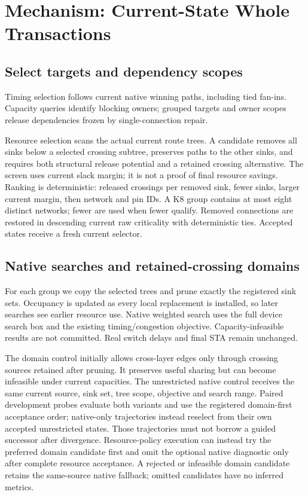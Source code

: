 \documentclass[conference,10pt]{IEEEtran}
\begin{document}
\section{Mechanism: Current-State Whole Transactions}
\subsection{Select targets and dependency scopes}
Timing selection follows current native winning paths, including tied fan-ins. Capacity queries identify blocking owners; grouped targets and owner scopes release dependencies frozen by single-connection repair.

Resource selection scans the actual current route trees. A candidate removes all sinks below a selected crossing subtree, preserves paths to the other sinks, and requires both structural release potential and a retained crossing alternative. The screen uses current slack margin; it is not a proof of final resource savings. Ranking is deterministic: released crossings per removed sink, fewer sinks, larger current margin, then network and pin IDs. A K8 group contains at most eight distinct networks; fewer are used when fewer qualify. Removed connections are restored in descending current raw criticality with deterministic ties. Accepted states receive a fresh current selector.

\subsection{Native searches and retained-crossing domains}
For each group we copy the selected trees and prune exactly the registered sink sets. Occupancy is updated as every local replacement is installed, so later searches see earlier resource use. Native weighted search uses the full device search box and the existing timing/congestion objective. Capacity-infeasible results are not committed. Real switch delays and final STA remain unchanged.

The domain control initially allows cross-layer edges only through crossing sources retained after pruning. It preserves useful sharing but can become infeasible under current capacities. The unrestricted native control receives the same current source, sink set, tree scope, objective and search range. Paired development probes evaluate both variants and use the registered domain-first acceptance order; native-only trajectories instead reselect from their own accepted unrestricted states. Those trajectories must not borrow a guided successor after divergence. Resource-policy execution can instead try the preferred domain candidate first and omit the optional native diagnostic only after complete resource acceptance. A rejected or infeasible domain candidate retains the same-source native fallback; omitted candidates have no inferred metrics.
\end{document}
